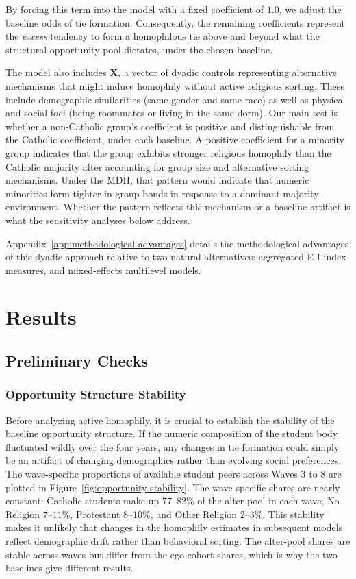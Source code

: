 \documentclass[11pt]{article}
\begin{document}
By forcing this term into the model with a fixed coefficient of $1.0$, we adjust the baseline odds of tie formation. Consequently, the remaining coefficients represent the \textit{excess} tendency to form a homophilous tie above and beyond what the structural opportunity pool dictates, under the chosen baseline.

The model also includes $\mathbf{X}$, a vector of dyadic controls representing alternative mechanisms that might induce homophily without active religious sorting. These include demographic similarities (same gender and same race) as well as physical and social foci (being roommates or living in the same dorm). Our main test is whether a non-Catholic group's coefficient is positive and distinguishable from the Catholic coefficient, under each baseline. A positive coefficient for a minority group indicates that the group exhibits stronger religious homophily than the Catholic majority after accounting for group size and alternative sorting mechanisms. Under the MDH, that pattern would indicate that numeric minorities form tighter in-group bonds in response to a dominant-majority environment. Whether the pattern reflects this mechanism or a baseline artifact is what the sensitivity analyses below address.

Appendix~\ref{app:methodological-advantages} details the methodological advantages of this dyadic approach relative to two natural alternatives: aggregated E-I index measures, and mixed-effects multilevel models.

\section{Results}

\subsection{Preliminary Checks}

\subsubsection{Opportunity Structure Stability}

Before analyzing active homophily, it is crucial to establish the stability of the baseline opportunity structure. If the numeric composition of the student body fluctuated wildly over the four years, any changes in tie formation could simply be an artifact of changing demographics rather than evolving social preferences. The wave-specific proportions of available student peers across Waves 3 to 8 are plotted in Figure~\ref{fig:opportunity-stability}. The wave-specific shares are nearly constant: Catholic students make up $77$--$82\%$ of the alter pool in each wave, No Religion $7$--$11\%$, Protestant $8$--$10\%$, and Other Religion $2$--$3\%$. This stability makes it unlikely that changes in the homophily estimates in subsequent models reflect demographic drift rather than behavioral sorting. The alter-pool shares are stable across waves but differ from the ego-cohort shares, which is why the two baselines give different results.
\end{document}
